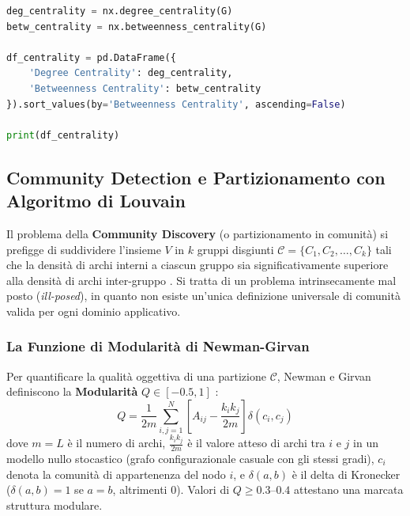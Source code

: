 \begin{lstlisting}[language=Python, caption={Calcolo comparativo di Degree Centrality e Betweenness Centrality.}]
deg_centrality = nx.degree_centrality(G)
betw_centrality = nx.betweenness_centrality(G)

df_centrality = pd.DataFrame({
    'Degree Centrality': deg_centrality,
    'Betweenness Centrality': betw_centrality
}).sort_values(by='Betweenness Centrality', ascending=False)

print(df_centrality)
\end{lstlisting}

\FloatBarrier
\subsection{Community Detection e Partizionamento con Algoritmo di Louvain}
\label{subsec:lab-community-louvain}

Il problema della \textbf{Community Discovery} (o partizionamento in comunità) si prefigge di suddividere l'insieme $V$ in $k$ gruppi disgiunti $\mathcal{C} = \{C_1, C_2, \dots, C_k\}$ tali che la densità di archi interni a ciascun gruppo sia significativamente superiore alla densità di archi inter-gruppo \cite{fortunato2010}. Si tratta di un problema intrinsecamente mal posto (\textit{ill-posed}), in quanto non esiste un'unica definizione universale di comunità valida per ogni dominio applicativo.

\subsubsection{La Funzione di Modularità di Newman-Girvan}
Per quantificare la qualità oggettiva di una partizione $\mathcal{C}$, Newman e Girvan definiscono la \textbf{Modularità} $Q \in [-0.5, 1]$ \cite{fortunato2010}:
\begin{equation}
    Q = \frac{1}{2m} \sum_{i,j=1}^N \left[ A_{ij} - \frac{k_i k_j}{2m} \right] \delta(c_i, c_j)
\end{equation}
dove $m = L$ è il numero di archi, $\frac{k_i k_j}{2m}$ è il valore atteso di archi tra $i$ e $j$ in un modello nullo stocastico (grafo configurazionale casuale con gli stessi gradi), $c_i$ denota la comunità di appartenenza del nodo $i$, e $\delta(a, b)$ è il delta di Kronecker ($\delta(a,b)=1$ se $a=b$, altrimenti $0$). Valori di $Q \ge 0.3$--$0.4$ attestano una marcata struttura modulare.

